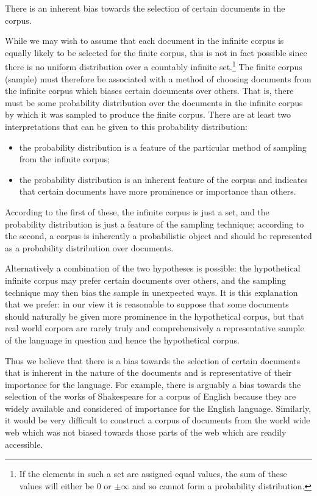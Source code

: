 \documentclass[12pt]{report}
\begin{document}
\begin{assumption}There is an inherent bias towards the selection of certain documents in the corpus.\end{assumption} \noindent
While we may wish to assume that each document in the infinite corpus is equally likely to be selected for the finite corpus, this is not in fact possible since there is no uniform distribution over a countably infinite set.\footnote{If the elements in such a set are assigned equal values, the sum of these values will either be 0 or $\pm\infty$ and so cannot form a probability distribution.} The finite corpus (sample) must therefore be associated with a method of choosing documents from the infinite corpus which biases certain documents over others. That is, there must be some probability distribution over the documents in the infinite corpus by which it was sampled to produce the finite corpus. There are at least two interpretations that can be given to this probability distribution:
\begin{itemize}
\item the probability distribution is a feature of the particular method of sampling from the infinite corpus;
\item the probability distribution is an inherent feature of the corpus and indicates that certain documents have more prominence or importance than others.
\end{itemize}
According to the first of these, the infinite  corpus is just a set, and the probability distribution is just a feature of the sampling technique; according to the second, a corpus is inherently a probabilistic object and should be represented as a probability distribution over documents.

Alternatively a combination of the two hypotheses is possible: the hypothetical infinite corpus may prefer certain documents over others, and the sampling technique may then bias the sample in unexpected ways. It is this explanation that we prefer: in our view it is reasonable to suppose that some documents should naturally be given more prominence in the hypothetical corpus, but that real world corpora are rarely truly and comprehensively a representative sample of the language in question and hence the hypothetical corpus. 

Thus we believe that there is a bias towards the selection of certain documents that is inherent in the nature of the documents and is representative of their importance for the language. For example, there is arguably a bias towards the selection of the works of Shakespeare for a corpus of English because they are widely available and considered of importance for the English language. Similarly, it would be very difficult to construct a corpus of documents from the world wide web which was not biased towards those parts of the web which are readily accessible. 
\end{document}
